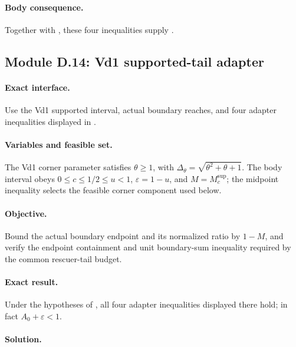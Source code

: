 \paragraph{Body consequence.}
Together with , these four inequalities
supply .

\subsection{Module D.14: Vd1 supported-tail adapter}

\paragraph{Exact interface.}
Use the Vd1 supported interval, actual boundary reaches, and four adapter
inequalities displayed in .

\paragraph{Variables and feasible set.}
The Vd1 corner parameter satisfies $\theta\ge1$, with
$\Delta_\theta=\sqrt{\theta^2+\theta+1}$.  The body interval obeys
$0\le c\le1/2\le u<1$, $\varepsilon=1-u$, and
$M=M_c^{\mathrm{sup}}$; the midpoint inequality selects the feasible corner
component used below.

\paragraph{Objective.}
Bound the actual boundary endpoint and its normalized ratio by $1-M$, and
verify the endpoint containment and unit boundary-sum inequality required by
the common rescuer-tail budget.

\paragraph{Exact result.}

\begin{lemma}
\label{lem:app-vd1-supported-adapter}
Under the hypotheses of , all four
adapter inequalities displayed there hold; in fact
$A_0+\varepsilon<1$.
\end{lemma}

\paragraph{Solution.}

